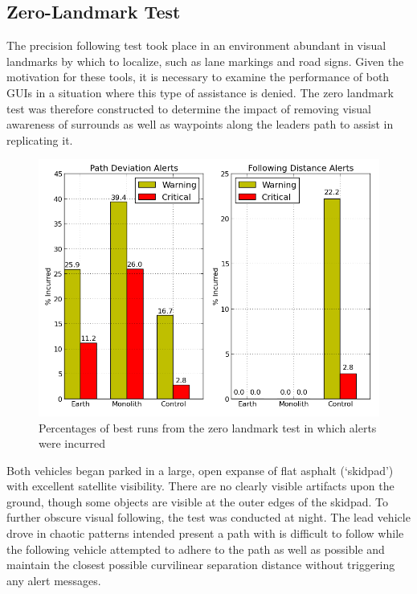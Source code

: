 \documentclass[twocolumn,10pt]{article}
\begin{document}
  \subsection*{Zero-Landmark Test}

    The precision following test took place in an environment abundant in visual landmarks by which to localize, such as lane markings and road signs.  Given the motivation for these tools, it is necessary to examine the performance of both GUIs in a situation where this type of assistance is denied.  The zero landmark test was therefore constructed to determine the impact of removing visual awareness of surrounds as well as waypoints along the leaders path to assist in replicating it.
    
    \begin{figure}[ht] \centering
      \includegraphics[width=\columnwidth]{../graphics/zero_landmark_alert_percents.png}
      \caption{Percentages of best runs from the zero landmark test in which alerts were incurred}
      \label{fig:zero_landmark_alert_percents}
    \end{figure}

    Both vehicles began parked in a large, open expanse of flat asphalt (`skidpad') with excellent satellite visibility.  There are no clearly visible artifacts upon the ground, though some objects are visible at the outer edges of the skidpad.  To further obscure visual following, the test was conducted at night.  The lead vehicle drove in chaotic patterns intended present a path with is difficult to follow while the following vehicle attempted to adhere to the path as well as possible and maintain the closest possible curvilinear separation distance without triggering any alert messages.
\end{document}
